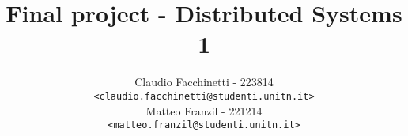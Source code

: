 \documentclass[a4paper]{article}
\begin{document}
\title{Final project - Distributed Systems 1}  
\author{Claudio Facchinetti - 223814 \\ \texttt{<claudio.facchinetti@studenti.unitn.it>}\\
Matteo Franzil - 221214 \\
\texttt{<matteo.franzil@studenti.unitn.it>}}

\maketitle





\end{document}

